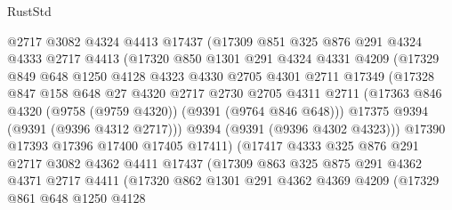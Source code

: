 \begin{lexlean}{RustStd}
\begin{coremodule}
                  @2717
                  @3082
                  @4324
                  @4413
                  @17437
                  (@17309
                    @851
                    @325
                    @876
                    @291
                    @4324
                    @4333
                    @2717
                    @4413
                    (@17320
                      @850
                      @1301
                      @291
                      @4324
                      @4331
                      @4209
                      (@17329
                        @849
                        @648
                        @1250
                        @4128
                        @4323
                        @4330
                        @2705
                        @4301
                        @2711
                        @17349
                        (@17328
                          @847
                          @158
                          @648
                          @27
                          @4320
                          @2717
                          @2730
                          @2705
                          @4311
                          @2711
                          (@17363 @846 @4320 (@9758 (@9759 @4320)) (@9391 (@9764 @846 @648)))
                          @17375
                          @9394
                          (@9391 (@9396 @4312 @2717)))
                        @9394
                        (@9391 (@9396 @4302 @4323)))
                      @17390
                      @17393
                      @17396
                      @17400
                      @17405
                      @17411)
                    (@17417
                      @4333
                      @325
                      @876
                      @291
                      @2717
                      @3082
                      @4362
                      @4411
                      @17437
                      (@17309
                        @863
                        @325
                        @875
                        @291
                        @4362
                        @4371
                        @2717
                        @4411
                        (@17320
                          @862
                          @1301
                          @291
                          @4362
                          @4369
                          @4209
                          (@17329
                            @861
                            @648
                            @1250
                            @4128

\end{coremodule}
\end{lexlean}
